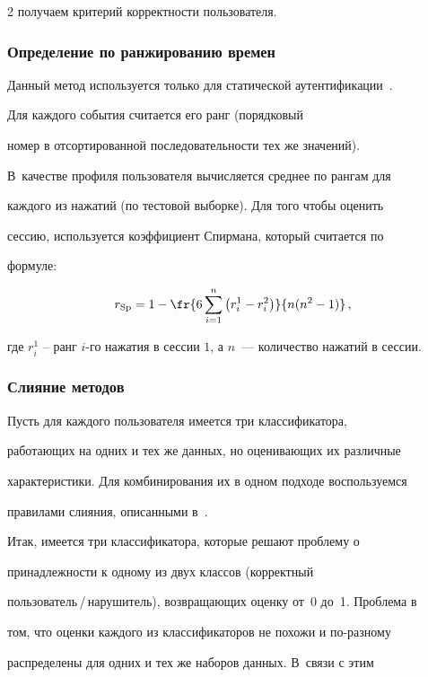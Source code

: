 \begin{multicols}{2}
получаем критерий корректности пользователя.



\subsubsection{Определение по ранжированию времен}



Данный метод используется только для статической аутентификации~\cite{bergadano}. 

Для каждого события считается его ранг (порядковый

номер в отсортированной последовательности тех же значений). 

В~качестве профиля пользователя вычисляется среднее по рангам для

каждого из нажатий (по тестовой выборке). Для того чтобы оценить

сессию, используется коэффициент Спирмана, который считается по

формуле:

$$r_{\mathrm{Sp}} = 1 - \fr{6 \sum\limits_{i=1}^n\left(r_i^1 - r_i^2\right)}{n  (n^2 -1)}\,,

$$

где $r_i^1$ -- ранг $i$-го нажатия в сессии $1$, а $n$~--- количество нажатий в сессии.



\subsubsection{Слияние методов}

Пусть для каждого пользователя имеется три классификатора,

работающих на одних и тех же данных, но оценивающих их различные

характеристики. Для комбинирования их в одном подходе воспользуемся

правилами слияния, описанными в~\cite{kittler}.



Итак, имеется три классификатора, которые решают проблему о

принадлежности к одному из двух классов (корректный

пользователь\,/\,на\-ру\-ши\-тель), возвращающих оценку от~0 до~1. Проблема в

том, что оценки каждого из классификаторов не похожи и по-раз\-но\-му

распределены для одних и тех же наборов данных. В~связи с этим


\end{multicols}

